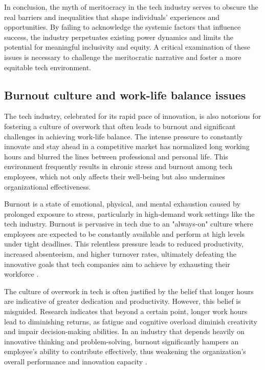 \begin{refsection}
In conclusion, the myth of meritocracy in the tech industry serves to obscure the real barriers and inequalities that shape individuals' experiences and opportunities. By failing to acknowledge the systemic factors that influence success, the industry perpetuates existing power dynamics and limits the potential for meaningful inclusivity and equity. A critical examination of these issues is necessary to challenge the meritocratic narrative and foster a more equitable tech environment.

\subsection{Burnout culture and work-life balance issues}

The tech industry, celebrated for its rapid pace of innovation, is also notorious for fostering a culture of overwork that often leads to burnout and significant challenges in achieving work-life balance. The intense pressure to constantly innovate and stay ahead in a competitive market has normalized long working hours and blurred the lines between professional and personal life. This environment frequently results in chronic stress and burnout among tech employees, which not only affects their well-being but also undermines organizational effectiveness.

Burnout is a state of emotional, physical, and mental exhaustion caused by prolonged exposure to stress, particularly in high-demand work settings like the tech industry. Burnout is pervasive in tech due to an "always-on" culture where employees are expected to be constantly available and perform at high levels under tight deadlines. This relentless pressure leads to reduced productivity, increased absenteeism, and higher turnover rates, ultimately defeating the innovative goals that tech companies aim to achieve by exhausting their workforce \cite[pp.~397-422]{maslach2001job}.

The culture of overwork in tech is often justified by the belief that longer hours are indicative of greater dedication and productivity. However, this belief is misguided. Research indicates that beyond a certain point, longer work hours lead to diminishing returns, as fatigue and cognitive overload diminish creativity and impair decision-making abilities. In an industry that depends heavily on innovative thinking and problem-solving, burnout significantly hampers an employee’s ability to contribute effectively, thus weakening the organization’s overall performance and innovation capacity \cite[pp.~23-25]{pfeffer2018dying}.


\end{refsection}
